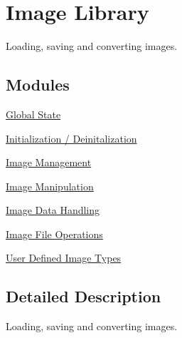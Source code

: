 \hypertarget{group___i_l}{\section{Image Library}
\label{group___i_l}
}


Loading, saving and converting images.  


\subsection*{Modules}
\begin{DoxyCompactItemize}
\item 
\hyperlink{group__state}{Global State}
\item 
\hyperlink{group__setup}{Initialization / Deinitalization}
\item 
\hyperlink{group__image__mgt}{Image Management}
\item 
\hyperlink{group__image__manip}{Image Manipulation}
\item 
\hyperlink{group__data}{Image Data Handling}
\item 
\hyperlink{group__file}{Image File Operations}
\item 
\hyperlink{group__register}{User Defined Image Types}
\end{DoxyCompactItemize}


\subsection{Detailed Description}
Loading, saving and converting images. 